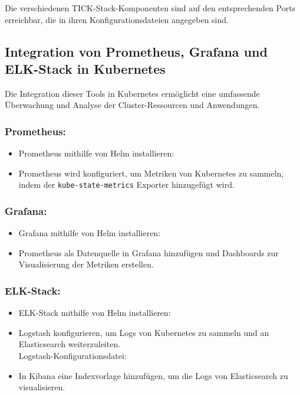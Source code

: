 \noindent
Die verschiedenen TICK-Stack-Komponenten sind auf den entsprechenden Ports erreichbar, die in ihren Konfigurationsdateien angegeben sind.




\newpage

\subsection{Integration von Prometheus, Grafana und ELK-Stack in Kubernetes}
Die Integration dieser Tools in Kubernetes ermöglicht eine umfassende Überwachung und Analyse der Cluster-Ressourcen und Anwendungen.

\subsubsection{Prometheus:}
\begin{itemize}
  \item Prometheus mithilfe von Helm installieren:
  
  \item Prometheus wird konfiguriert, um Metriken von Kubernetes zu sammeln, indem der \texttt{kube-state-metrics} Exporter hinzugefügt wird.
\end{itemize}

\subsubsection{Grafana:}
\begin{itemize}
  \item Grafana mithilfe von Helm installieren:
  
    \item Prometheus als Datenquelle in Grafana hinzufügen und Dashboards zur Visualisierung der Metriken erstellen.
\end{itemize}

\subsubsection{ELK-Stack:}
\begin{itemize}
  \item ELK-Stack mithilfe von Helm installieren:
  
  \item Logstash konfigurieren, um Logs von Kubernetes zu sammeln und an Elasticsearch weiterzuleiten.\\
  Logstash-Konfigurationsdatei:
  
  \item In Kibana eine Indexvorlage hinzufügen, um die Logs von Elasticsearch zu visualisieren.
\end{itemize}
\newpage
